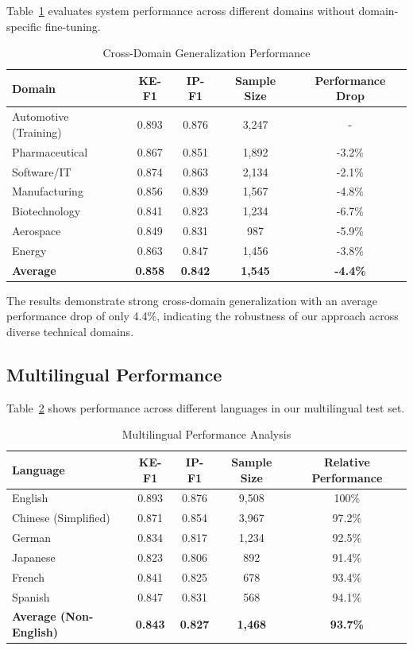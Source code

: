 \documentclass[11pt,a4paper]{article}
\begin{document}
Table~\ref{tab:cross_domain} evaluates system performance across different domains without domain-specific fine-tuning.

\begin{table}[htbp]
\centering
\caption{Cross-Domain Generalization Performance}
\label{tab:cross_domain}
\begin{tabular}{lcccc}
\toprule
\textbf{Domain} & \textbf{KE-F1} & \textbf{IP-F1} & \textbf{Sample Size} & \textbf{Performance Drop} \\
\midrule
Automotive (Training) & 0.893 & 0.876 & 3,247 & - \\
\midrule
Pharmaceutical & 0.867 & 0.851 & 1,892 & -3.2\% \\
Software/IT & 0.874 & 0.863 & 2,134 & -2.1\% \\
Manufacturing & 0.856 & 0.839 & 1,567 & -4.8\% \\
Biotechnology & 0.841 & 0.823 & 1,234 & -6.7\% \\
Aerospace & 0.849 & 0.831 & 987 & -5.9\% \\
Energy & 0.863 & 0.847 & 1,456 & -3.8\% \\
\midrule
\textbf{Average} & \textbf{0.858} & \textbf{0.842} & \textbf{1,545} & \textbf{-4.4\%} \\
\bottomrule
\end{tabular}
\end{table}

The results demonstrate strong cross-domain generalization with an average performance drop of only 4.4\%, indicating the robustness of our approach across diverse technical domains.

\subsection{Multilingual Performance}

Table~\ref{tab:multilingual} shows performance across different languages in our multilingual test set.

\begin{table}[htbp]
\centering
\caption{Multilingual Performance Analysis}
\label{tab:multilingual}
\begin{tabular}{lcccc}
\toprule
\textbf{Language} & \textbf{KE-F1} & \textbf{IP-F1} & \textbf{Sample Size} & \textbf{Relative Performance} \\
\midrule
English & 0.893 & 0.876 & 9,508 & 100\% \\
Chinese (Simplified) & 0.871 & 0.854 & 3,967 & 97.2\% \\
German & 0.834 & 0.817 & 1,234 & 92.5\% \\
Japanese & 0.823 & 0.806 & 892 & 91.4\% \\
French & 0.841 & 0.825 & 678 & 93.4\% \\
Spanish & 0.847 & 0.831 & 568 & 94.1\% \\
\midrule
\textbf{Average (Non-English)} & \textbf{0.843} & \textbf{0.827} & \textbf{1,468} & \textbf{93.7\%} \\
\bottomrule
\end{tabular}
\end{table}
\end{document}
